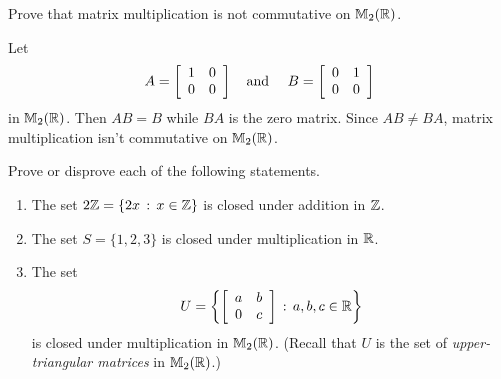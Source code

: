 \begin{exercise}[ID=2E]
Prove that matrix multiplication is not commutative on $\mathbb{M}_2(\mathbb{R})$.
\end{exercise}

\begin{solution}[print=false]
Let $$A=\left[
          \begin{array}{cc}
            1 & 0 \\
            0 & 0 \\
          \end{array}
        \right] \mbox{\quad and \quad}B=\left[
          \begin{array}{cc}
            0 & 1 \\
            0 & 0 \\
          \end{array}
        \right]$$ in $\mathbb{M}_2(\mathbb{R})$.  Then $AB=B$ while $BA$ is the zero matrix.  Since $AB\neq BA$, matrix multiplication isn't commutative on $\mathbb{M}_2(\mathbb{R})$.
\end{solution}


\begin{exercise}[ID=2G]
Prove or disprove each of the following statements.

\begin{enumerate}
\item The set $2\mathbb{Z}=\{2x\,:\,x\in \mathbb{Z}\}$ is closed under addition in $\mathbb{Z}$.
\item The set $S=\{1,2,3\}$ is closed under multiplication in $\mathbb{R}$.
\item The set $$U=\left\{\left[
                     \begin{array}{cc}
                      a & b \\
                       0 & c \\
                     \end{array}
                   \right]\,:\, a,b,c\in \mathbb{R} \right\}$$ is closed under multiplication in $\mathbb{M}_2(\mathbb{R})$. (Recall that $U$ is  the set of \textit{upper-triangular matrices} in $\mathbb{M}_2(\mathbb{R})$.)
\end{enumerate}

\end{exercise}

